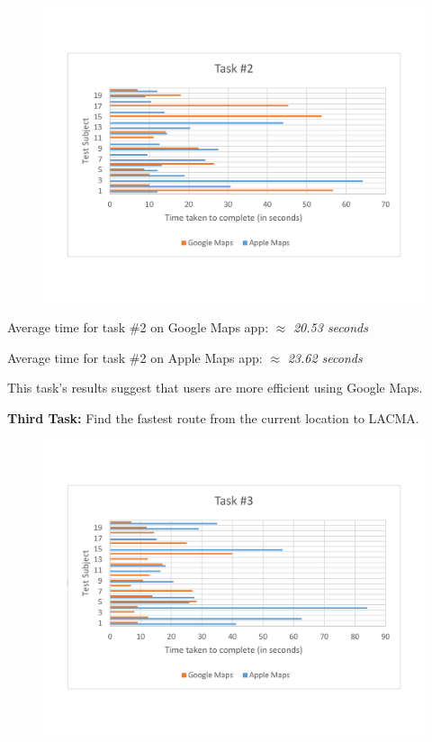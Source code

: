 \documentclass[a4paper; 11pt]{article}
\begin{document}
\begin{figure}[htbp]
\begin{center}
\vspace{-.4in}
\includegraphics[keepaspectratio, width=.8\textwidth ]{task2.pdf}
\end{center}
\end{figure}
\begin{center}
\vspace{-.6in}
\par
Average time for task \#2 on Google Maps app: $ \approx $ \textit{20.53 seconds}
\par
Average time for task \#2 on Apple Maps app: $ \approx $ \textit{23.62 seconds}
\end{center}
\par
\noindent
\medskip
\medskip
This task's results suggest that users are more efficient using Google Maps. 
\par
\noindent
\textbf{Third Task: }Find the fastest route from the current location to LACMA.
\begin{figure}[htbp]
\begin{center}
\vspace{-.4in}
\includegraphics[keepaspectratio, width=.8\textwidth ]{task3.pdf}
\end{center}
\end{figure}
\end{document}

